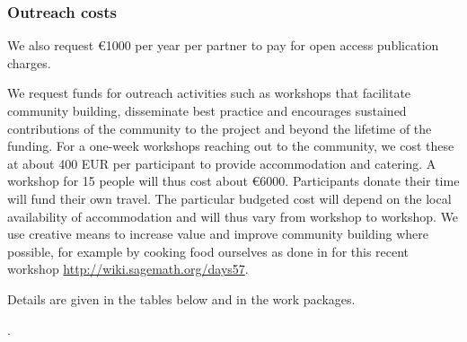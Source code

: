 \subsubsection{Outreach costs}
\label{sect:budget-outreach-publication-charges}
We also request \euro{1000} per year per partner to pay for open
access publication charges.

\label{sect:budget-outreach-workshops}
We request funds for outreach activities such as workshops that
facilitate community building, disseminate best practice and
encourages sustained contributions of the community to the project and
beyond the lifetime of the funding. For a one-week workshops reaching
out to the community, we cost these at about 400 EUR per participant
to provide accommodation and catering. A workshop for 15 people will
thus cost about \euro{6000}. Participants donate their time will fund
their own travel. The particular budgeted cost will depend on the
local availability of accommodation and will thus vary from workshop to
workshop. We use creative means to increase value and improve
community building where possible, for example by cooking food
ourselves as done in for this recent workshop
\href{http://wiki.sagemath.org/days57}{http://wiki.sagemath.org/days57}.

Details are given in the tables below and in the work packages.


.







